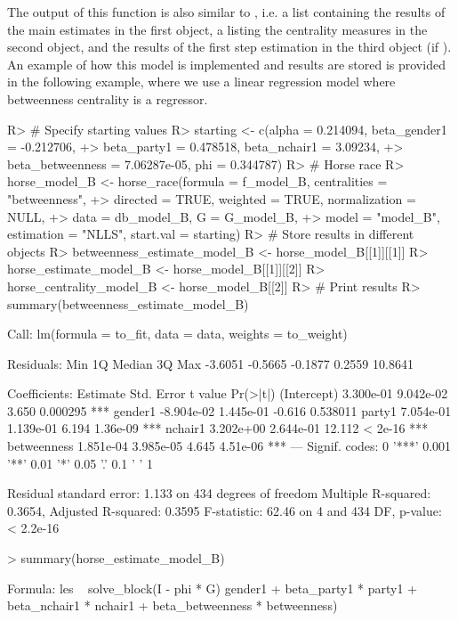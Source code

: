 \documentclass[nojss]{jss}
\begin{document}
The output of this function is also similar to , i.e. a list containing the results of the main estimates in the first object, a  listing the centrality measures in the second object, and the results of the first step estimation in the third object (if ). An example of how this model is implemented and results are stored is provided in the following example, where we use a
linear regression model where betweenness centrality is a regressor.
\newpage
\begin{CodeChunk}
\begin{CodeInput}
R> # Specify starting values
R> starting <- c(alpha = 0.214094, beta_gender1 = -0.212706,
+> beta_party1 = 0.478518, beta_nchair1 = 3.09234,
+> beta_betweenness = 7.06287e-05, phi = 0.344787)
R> # Horse race 
R> horse_model_B <- horse_race(formula = f_model_B, centralities = "betweenness",
+> directed = TRUE, weighted = TRUE, normalization = NULL,
+> data = db_model_B, G = G_model_B,
+> model = "model_B", estimation = "NLLS", start.val = starting)
R> # Store results in different objects
R> betweenness_estimate_model_B <- horse_model_B[[1]][[1]]
R> horse_estimate_model_B <- horse_model_B[[1]][[2]]
R> horse_centrality_model_B <- horse_model_B[[2]]
R> # Print results
R> summary(betweenness_estimate_model_B)
\end{CodeInput}
\begin{CodeOutput}
Call:
lm(formula = to_fit, data = data, weights = to_weight)

Residuals:
Min      1Q  Median      3Q     Max 
-3.6051 -0.5665 -0.1877  0.2559 10.8641 

Coefficients:
Estimate Std. Error t value Pr(>|t|)    
(Intercept)  3.300e-01  9.042e-02   3.650 0.000295 ***
gender1     -8.904e-02  1.445e-01  -0.616 0.538011    
party1       7.054e-01  1.139e-01   6.194 1.36e-09 ***
nchair1      3.202e+00  2.644e-01  12.112  < 2e-16 ***
betweenness  1.851e-04  3.985e-05   4.645 4.51e-06 ***
---
Signif. codes:  0 '***' 0.001 '**' 0.01 '*' 0.05 '.' 0.1 ' ' 1

Residual standard error: 1.133 on 434 degrees of freedom
Multiple R-squared:  0.3654,	Adjusted R-squared:  0.3595 
F-statistic: 62.46 on 4 and 434 DF,  p-value: < 2.2e-16

\end{CodeOutput}
\begin{CodeInput}
> summary(horse_estimate_model_B)
\end{CodeInput}
\begin{CodeOutput}
Formula: les ~ solve_block(I - phi * G) %
gender1 + beta_party1 * party1 + beta_nchair1 * nchair1 + 
beta_betweenness * betweenness)


\end{CodeOutput}
\end{CodeChunk}
\end{document}
